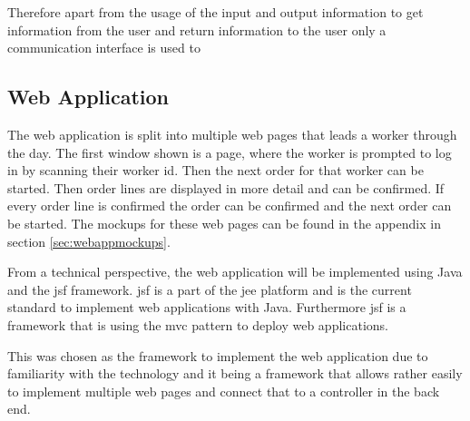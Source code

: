 Therefore apart from the usage of the input and output information to get information from the user and return information to the user only a communication interface is used to 

\subsection{Web Application}
The web application is split into multiple web pages that leads a worker through the day. The first window shown is a page, where the worker is prompted to log in by scanning their worker id. Then the next order for that worker can be started. Then order lines are displayed in more detail and can be confirmed. If every order line is confirmed the order can be confirmed and the next order can be started. The mockups for these web pages can be found in the appendix in section \ref{sec:webappmockups}.

From a technical perspective, the web application will be implemented using Java and the \gls{jsf} framework. \gls{jsf} is a part of the \gls{jee} platform and is the current standard to implement web applications with Java. Furthermore \gls{jsf} is a framework that is using the \gls{mvc} pattern to deploy web applications. 

This was chosen as the framework to implement the web application due to familiarity with the technology and it being a framework that allows rather easily to implement multiple web pages and connect that to a controller in the back end.